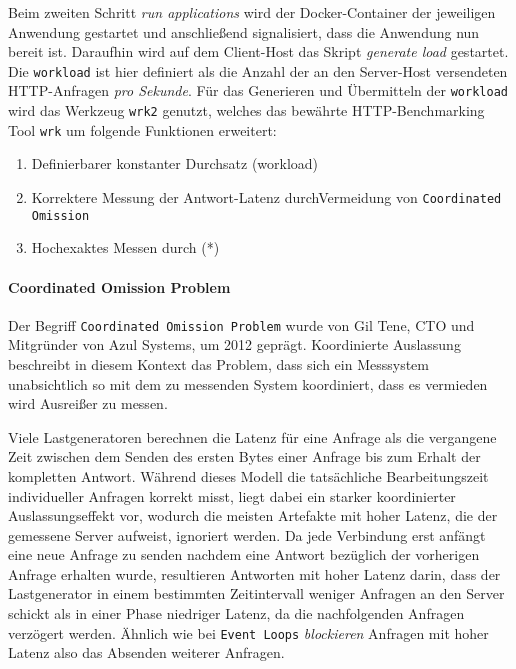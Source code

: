 Beim zweiten Schritt \textit{run applications} wird der Docker-Container der jeweiligen Anwendung gestartet und anschließend signalisiert,
dass die Anwendung nun bereit ist.
Daraufhin wird auf dem Client-Host das Skript \textit{generate load} gestartet.
Die \verb|workload| ist hier definiert als die Anzahl der an den Server-Host versendeten HTTP-Anfragen \textit{pro Sekunde}.
Für das Generieren und Übermitteln der \verb|workload| wird das Werkzeug \verb|wrk2| genutzt, welches das
bewährte HTTP-Benchmarking Tool \verb|wrk| um folgende Funktionen erweitert:\parencite{Wrk2, Wrk}
\begin{enumerate}
  \item Definierbarer konstanter Durchsatz (workload)
  \item Korrektere Messung der Antwort-Latenz durch\newline Vermeidung von \verb|Coordinated Omission|
  \item Hochexaktes Messen durch (*)
\end{enumerate}

\paragraph{Coordinated Omission Problem}
Der Begriff \verb|Coordinated Omission Problem| wurde von Gil Tene, CTO und Mitgründer von Azul Systems, um 2012 geprägt.
Koordinierte Auslassung beschreibt in diesem Kontext das Problem, dass sich ein Messsystem unabsichtlich so mit dem zu messenden System   koordiniert,
dass es vermieden wird Ausreißer zu messen.

Viele Lastgeneratoren berechnen die Latenz für eine Anfrage als die vergangene Zeit zwischen dem Senden des ersten Bytes einer Anfrage
bis zum Erhalt der kompletten Antwort. Während dieses Modell die tatsächliche Bearbeitungszeit individueller Anfragen korrekt misst,
liegt dabei ein starker koordinierter Auslassungseffekt vor,
wodurch die meisten Artefakte mit hoher Latenz, die der gemessene Server aufweist, ignoriert werden.
Da jede Verbindung erst anfängt eine neue Anfrage zu senden nachdem eine Antwort bezüglich der vorherigen Anfrage erhalten wurde,
resultieren Antworten mit hoher Latenz darin, dass der Lastgenerator in einem bestimmten Zeitintervall weniger Anfragen an den Server schickt als in einer
Phase niedriger Latenz, da die nachfolgenden Anfragen verzögert werden. Ähnlich wie bei \verb|Event Loops| \textit{blockieren}
Anfragen mit hoher Latenz also das Absenden weiterer Anfragen.

